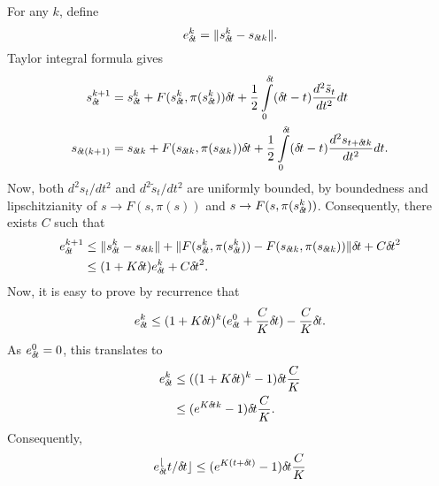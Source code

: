 For any $k$, define
\begin{equation}
	e_\deltat^k = \|s_\deltat^k - s_{\deltat k}\|.
\end{equation}
Taylor integral formula gives
\begin{align}
	s_\deltat^{k + 1} &= s_\deltat^k + F(s_\deltat^k, \pi(s_\deltat^k)) \deltat +
	\frac{1}{2}\int\limits_{0}^\deltat (\deltat - t) \frac{d^2 \tilde{s}_t}{dt^2} dt\\
	s_{\deltat(k + 1)} &= s_{\deltat k} + F(s_{\deltat k}, \pi(s_{\deltat k})) \deltat +
	\frac{1}{2}\int\limits_0^\deltat (\deltat - t) \frac{d^2 s_{t + \deltat k}}{dt^2} dt.
\end{align}
Now, both $d^2 s_t/dt^2$ and $d^2 \tilde{s}_t/dt^2$ are uniformly bounded, by
boundedness and lipschitzianity of $s \rightarrow F(s, \pi(s))$ and $s
\rightarrow F(s, \pi(s_\deltat^k))$. Consequently, there exists $C$ such that
\begin{align}
	e_\deltat^{k + 1} &\leq \|s_\deltat^k - s_{\deltat k}\| + \|F(s_\deltat^k, \pi(s_\deltat^k)) - F(s_{\deltat k}, \pi(s_{\deltat k}))\| \deltat + C \deltat^2\\
			  &\leq (1 + K \deltat) e_\deltat^k + C \deltat^2.
\end{align}
Now, it is easy to prove by recurrence that
\begin{equation}
	e_\deltat^k \leq (1 + K \deltat)^k (e_\deltat^0 + \frac{C}{K} \deltat) - \frac{C}{K}\deltat.
\end{equation}
As $e_\deltat^0 = 0$, this translates to
\begin{align}
	e_\deltat^k &\leq ((1 + K \deltat)^k - 1) \deltat \frac{C}{K}\\
		    &\leq (e^{K \deltat k} - 1) \deltat \frac{C}{K}.
\end{align}
Consequently,
\begin{equation}
	e_\deltat^\lfloor t / \deltat \rfloor \leq (e^{K(t + \deltat)} - 1) \deltat \frac{C}{K}
\end{equation}
